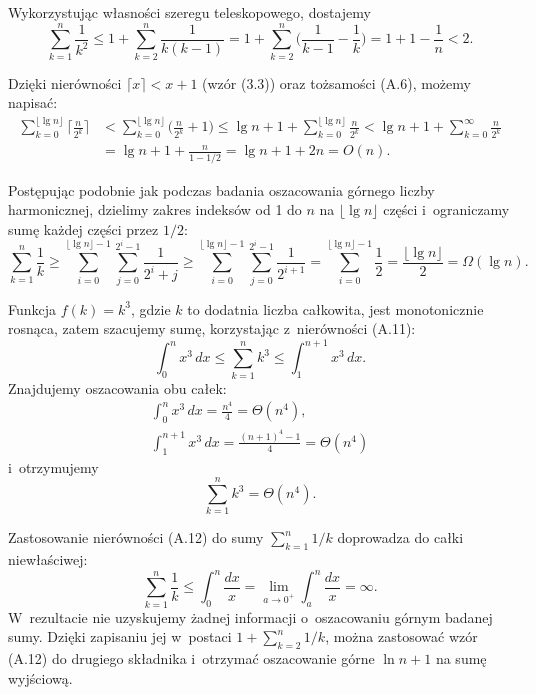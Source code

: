 
\exercise %
Wykorzystując własności szeregu teleskopowego, dostajemy
\[
	\sum_{k=1}^n\frac{1}{k^2} \le 1+\sum_{k=2}^n\frac{1}{k(k-1)} = 1+\sum_{k=2}^n\biggl(\frac{1}{k-1}-\frac{1}{k}\biggr) = 1+1-\frac{1}{n} < 2.
\]

\exercise %
Dzięki nierówności $\lceil x\rceil<x+1$ (wzór (3.3)) oraz tożsamości (A.6), możemy napisać:
\begin{align*}
	\sum_{k=0}^{\lfloor\lg n\rfloor}\biggl\lceil\frac{n}{2^k}\biggr\rceil &< \sum_{k=0}^{\lfloor\lg n\rfloor}\biggl(\frac{n}{2^k}+1\biggr) \le \lg n+1+\sum_{k=0}^{\lfloor\lg n\rfloor}\frac{n}{2^k} < \lg n+1+\sum_{k=0}^\infty\frac{n}{2^k} \\[2mm]
	&= \lg n+1+\frac{n}{1-1/2} = \lg n+1+2n = O(n).
\end{align*}

\exercise %
Postępując podobnie jak podczas badania oszacowania górnego  liczby harmonicznej, dzielimy zakres indeksów od 1 do $n$ na $\lfloor\lg n\rfloor$ części i~ograniczamy sumę każdej części przez $1/2$:
\[
    \sum_{k=1}^n\frac{1}{k} \ge \sum_{i=0}^{\lfloor\lg n\rfloor-1}\sum_{j=0}^{2^i-1}\frac{1}{2^i+j} \ge \sum_{i=0}^{\lfloor\lg n\rfloor-1}\sum_{j=0}^{2^i-1}\frac{1}{2^{i+1}} = \sum_{i=0}^{\lfloor\lg n\rfloor-1}\frac{1}{2} = \frac{\lfloor\lg n\rfloor}{2} = \Omega(\lg n).
\]

\exercise %
Funkcja $f(k)=k^3$, gdzie $k$ to dodatnia liczba całkowita, jest monotonicznie rosnąca, zatem szacujemy sumę, korzystając z~nierówności (A.11):
\[
	\int_0^nx^3\,dx \le \sum_{k=1}^nk^3 \le \int_1^{n+1}x^3\,dx.
\]
Znajdujemy oszacowania obu całek:
\begin{gather*}
	\int_0^nx^3\,dx = \frac{n^4}{4} = \Theta(n^4), \\[2mm]
	\int_1^{n+1}x^3\,dx = \frac{(n+1)^4-1}{4} = \Theta(n^4)
\end{gather*}
i~otrzymujemy
\[
	\sum_{k=1}^nk^3 = \Theta(n^4).
\]

\exercise %
Zastosowanie nierówności (A.12) do sumy $\sum_{k=1}^n1/k$ doprowadza do całki niewłaściwej:
\[
	\sum_{k=1}^n\frac{1}{k} \le \int_0^n\frac{dx}{x} = \lim_{a\to0^+}\int_a^n\frac{dx}{x} = \infty.
\]
W~rezultacie nie uzyskujemy żadnej informacji o~oszacowaniu górnym badanej sumy.
Dzięki zapisaniu jej w~postaci $1+\sum_{k=2}^n1/k$, można zastosować wzór (A.12) do drugiego składnika i~otrzymać oszacowanie górne $\ln n+1$ na sumę wyjściową.
